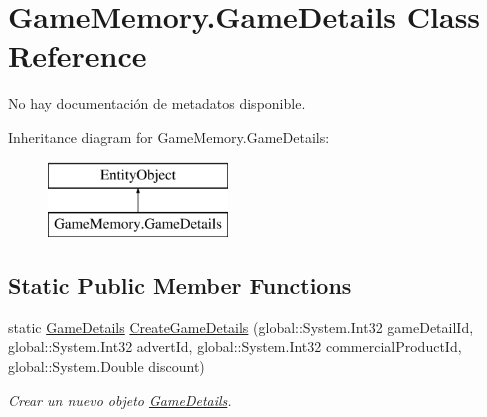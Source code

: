\hypertarget{class_game_memory_1_1_game_details}{\section{Game\-Memory.\-Game\-Details Class Reference}
\label{class_game_memory_1_1_game_details}
}


No hay documentación de metadatos disponible.  


Inheritance diagram for Game\-Memory.\-Game\-Details\-:\begin{figure}[H]
\begin{center}
\leavevmode
\includegraphics[height=2.000000cm]{class_game_memory_1_1_game_details}
\end{center}
\end{figure}
\subsection*{Static Public Member Functions}
\begin{DoxyCompactItemize}
\item 
static \hyperlink{class_game_memory_1_1_game_details}{Game\-Details} \hyperlink{class_game_memory_1_1_game_details_a0b80aa4ee5ac2a12dd819bf42d46a807}{Create\-Game\-Details} (global\-::\-System.\-Int32 game\-Detail\-Id, global\-::\-System.\-Int32 advert\-Id, global\-::\-System.\-Int32 commercial\-Product\-Id, global\-::\-System.\-Double discount)
\begin{DoxyCompactList}\small\item\em Crear un nuevo objeto \hyperlink{class_game_memory_1_1_game_details}{Game\-Details}. \end{DoxyCompactList}\end{DoxyCompactItemize}
